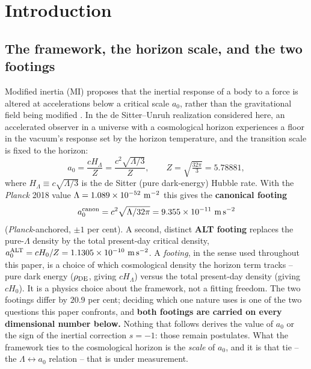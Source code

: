 \documentclass[fleqn,usenatbib]{mnras}
\begin{document}

\section{Introduction}
\label{sec:intro}

\subsection{The framework, the horizon scale, and the two footings}
\label{sec:footings}

Modified inertia (MI) proposes that the inertial response of a body to a force is altered at accelerations below a critical scale $a_0$, rather than the gravitational field being modified \citep{Milgrom1983,Milgrom1999}. In the de Sitter--Unruh realization considered here, an accelerated observer in a universe with a cosmological horizon experiences a floor in the vacuum's response set by the horizon temperature, and the transition scale is fixed to the horizon:
\begin{equation}
a_0 = \frac{cH_\Lambda}{Z} = \frac{c^2\sqrt{\Lambda/3}}{Z},\qquad Z=\sqrt{\tfrac{32\pi}{3}}=5.78881,
\label{eq:a0def}
\end{equation}
where $H_\Lambda\equiv c\sqrt{\Lambda/3}$ is the de Sitter (pure dark-energy) Hubble rate. With the \textit{Planck} 2018 value $\Lambda=1.089\times10^{-52}\ {\rm m^{-2}}$ \citep{Planck2018} this gives the \textbf{canonical footing}
\begin{equation}
a_0^{\rm canon}=c^2\sqrt{\Lambda/32\pi}=9.355\times10^{-11}\ {\rm m\,s^{-2}}
\label{eq:canon}
\end{equation}
(\textit{Planck}-anchored, $\pm1$ per cent).
A second, distinct \textbf{ALT footing} replaces the pure-$\Lambda$ density by the total present-day critical density, $a_0^{\rm ALT}=cH_0/Z=1.1305\times10^{-10}\ {\rm m\,s^{-2}}$. A \emph{footing}, in the sense used throughout this paper, is a choice of which cosmological density the horizon term tracks -- pure dark energy ($\rho_{\rm DE}$, giving $cH_\Lambda$) versus the total present-day density (giving $cH_0$). It is a physics choice about the framework, not a fitting freedom. The two footings differ by $20.9$ per cent; deciding which one nature uses is one of the two questions this paper confronts, and \textbf{both footings are carried on every dimensional number below.} Nothing that follows derives the value of $a_0$ or the sign of the inertial correction $s=-1$: those remain postulates. What the framework ties to the cosmological horizon is the \emph{scale} of $a_0$, and it is that tie -- the $\Lambda\leftrightarrow a_0$ relation -- that is under measurement.
\end{document}
